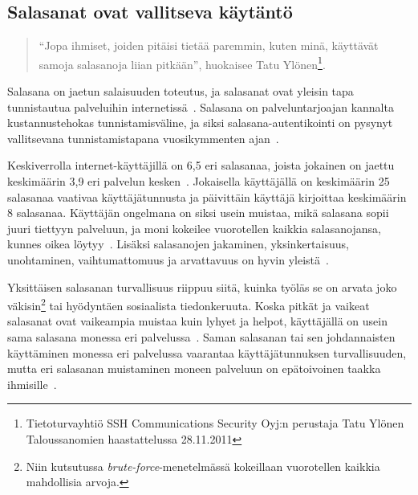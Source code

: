 \documentclass[finnish,gradu]{tktltiki}
\begin{document}
  \subsection{Salasanat ovat vallitseva käytäntö} %
  \label{sub:salasanat}

  \begin{quote}
    ``Jopa ihmiset, joiden pitäisi tietää paremmin, kuten minä, käyttävät samoja salasanoja liian pitkään'', huokaisee Tatu Ylönen\footnote{Tietoturvayhtiö SSH Communications Security Oyj:n perustaja Tatu Ylönen Taloussanomien haastattelussa 28.11.2011}.
  \end{quote}

  Salasana on jaetun salaisuuden toteutus, ja salasanat ovat yleisin tapa tunnistautua palveluihin internetissä~\cite{study_of_passwords_07, passpet_06, password_management_strategies_06, pwdhash_extension_05}. Salasana on palveluntarjoajan kannalta kustannustehokas tunnistamisväline, ja siksi salasana-autentikointi on pysynyt vallitsevana tunnistamistapana vuosikymmenten ajan~\cite{pw_auth_system_perspective_08}.

  Keskiverrolla internet-käyttäjillä on 6,5 eri salasanaa, joista jokainen on jaettu keskimäärin 3,9 eri palvelun kesken~\cite{study_of_passwords_07}. Jokaisella käyttäjällä on keskimäärin 25 salasanaa vaativaa käyttäjätunnusta ja päivittäin käyttäjä kirjoittaa keskimäärin 8 salasanaa. Käyttäjän ongelmana on siksi usein muistaa, mikä salasana sopii juuri tiettyyn palveluun, ja moni kokeilee vuorotellen kaikkia salasanojansa, kunnes oikea löytyy~\cite{study_of_passwords_07}. Lisäksi salasanojen jakaminen, yksinkertaisuus, unohtaminen, vaihtumattomuus ja arvattavuus on hyvin yleistä~\cite{password_management_strategies_06, pw_auth_system_perspective_08, passpet_06}.

  Yksittäisen salasanan turvallisuus riippuu siitä, kuinka työläs se on arvata joko väkisin\footnote{Niin kutsutussa \emph{brute-force}-menetelmässä kokeillaan vuorotellen kaikkia mahdollisia arvoja.} tai hyödyntäen sosiaalista tiedonkeruuta. Koska pitkät ja vaikeat salasanat ovat vaikeampia muistaa kuin lyhyet ja helpot, käyttäjällä on usein sama salasana monessa eri palvelussa~\cite{study_of_passwords_07}. Saman salasanan tai sen johdannaisten käyttäminen monessa eri palvelussa vaarantaa käyttäjätunnuksen turvallisuuden, mutta eri salasanan muistaminen moneen palveluun on epätoivoinen taakka ihmisille~\cite{password_management_strategies_06, passpet_06, pw_auth_system_perspective_08, users_are_not_the_enemy_99}.
\end{document}

